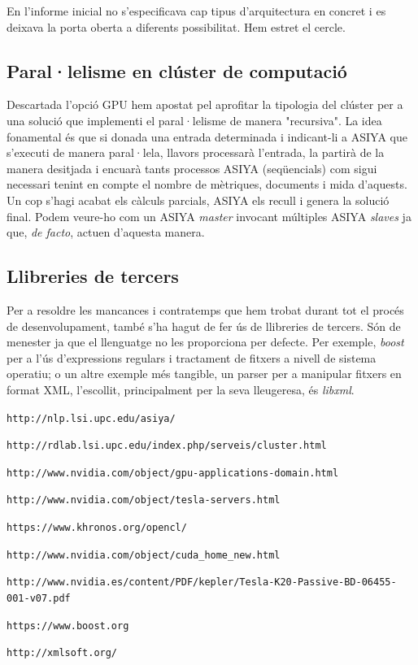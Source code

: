\documentclass[11pt,a4paper]{article}
\begin{document}
En l'informe inicial no s'especificava cap tipus d'arquitectura en concret i es deixava la porta oberta a diferents possibilitat. Hem estret el cercle.

\subsection{Paral·lelisme en clúster de computació}

Descartada l'opció GPU hem apostat pel aprofitar la tipologia del clúster per a una solució que implementi el paral·lelisme de manera "recursiva".  La idea fonamental és que si donada una entrada determinada i indicant-li a ASIYA que s'executi de manera paral·lela, llavors processarà l'entrada, la partirà de la manera desitjada i encuarà tants processos ASIYA (seqüencials) com sigui necessari tenint en compte el nombre de mètriques, documents i mida d'aquests. Un cop s'hagi acabat els càlculs parcials, ASIYA els recull i genera la solució final. Podem veure-ho com un ASIYA \emph{master} invocant múltiples ASIYA \emph{slaves} ja que, \textit{de facto}, actuen d'aquesta manera.

\subsection{Llibreries de tercers}
Per a resoldre les mancances i contratemps que hem trobat durant tot el procés de desenvolupament, també s'ha hagut de fer ús de llibreries de tercers. Són de menester ja que el llenguatge no les proporciona per defecte. Per exemple, \textit{boost}\cite{boost} per a l'ús d'expressions regulars i tractament de fitxers a nivell de sistema operatiu; o un altre exemple més tangible, un parser per a manipular fitxers en format XML, l'escollit, principalment per la seva lleugeresa, és \textit{libxml}\cite{libxml}.

\newpage
\begin{thebibliography}{10}
\texttt{http://nlp.lsi.upc.edu/asiya/}

\texttt{http://rdlab.lsi.upc.edu/index.php/serveis/cluster.html}

\texttt{http://www.nvidia.com/object/gpu-applications-domain.html}

\texttt{http://www.nvidia.com/object/tesla-servers.html}

\texttt{https://www.khronos.org/opencl/}

\texttt{http://www.nvidia.com/object/cuda\_home\_new.html}

\texttt{http://www.nvidia.es/content/PDF/kepler/Tesla-K20-Passive-BD-06455-001-v07.pdf}

\texttt{https://www.boost.org}

\texttt{http://xmlsoft.org/}
\end{thebibliography}
\end{document}
